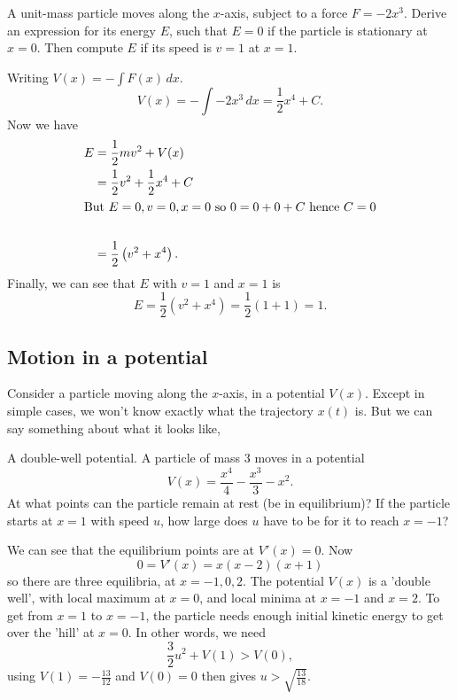\documentclass[10pt, a4paper]{article}
\begin{document}
\begin{example}
    A unit-mass particle moves along the $x$-axis,
    subject to a force $F = -2x ^ 3$.
    Derive an expression for its energy $E$,
    such that $E = 0$ if the particle is stationary at $x = 0$.
    Then compute $E$ if its speed is $v = 1$ at $x = 1$.
    \begin{solution}
        Writing $V(x) = -\int F(x)\,dx$.
        \[
        V(x) = -\int -2x ^ 3\,dx = \frac{1}{2}x ^ 4 + C.
        \]
        Now we have
        \begin{align*}
            E &= \frac{1}{2}mv ^ 2 + V(x) \\
            &= \frac{1}{2}v ^ 2 + \frac{1}{2}x ^ 4 + C \\
            \intertext{But $E = 0, v = 0, x = 0$ so $0 = 0 + 0 + C$ hence $C = 0$} \\
            &= \frac{1}{2}\left(v ^ 2 + x ^ 4\right).
        \end{align*}
        Finally,
        we can see that $E$ with $v = 1$ and $x = 1$ is
        \[
        E = \frac{1}{2}\left(v ^ 2 + x ^ 4\right) = \frac{1}{2}(1 + 1) = 1.
        \]
    \end{solution}
\end{example}

\subsection{Motion in a potential}
Consider a particle moving along the $x$-axis,
in a potential $V(x)$.
Except in simple cases,
we won't know exactly what the trajectory $x(t)$ is.
But we can say something about what it looks like,

\begin{example}
    A double-well potential.
    A particle of mass $3$ moves in a potential
    \[
    V(x) = \frac{x ^ 4}{4} - \frac{x ^ 3}{3} - x ^ 2.
    \]
    At what points can the particle remain at rest
    (be in equilibrium)?
    If the particle starts at $x = 1$ with speed $u$,
    how large does $u$ have to be for it to reach $x = -1$?
    \begin{solution}
        We can see that the equilibrium points are at $V'(x) = 0$.
        Now
        \[
        0 = V'(x) = x(x - 2)(x + 1)
        \]
        so there are three equilibria,
        at $x = -1, 0, 2$.
        The potential $V(x)$ is a 'double well',
        with local maximum at $x = 0$,
        and local minima at $x = -1$ and $x = 2$.
        To get from $x = 1$ to $x = -1$,
        the particle needs enough initial kinetic energy to get over the 'hill' at $x = 0$.
        In other words,
        we need
        \[
        \frac{3}{2}u ^ 2 + V(1) > V(0),
        \]
        using $V(1) = -\frac{13}{12}$ and $V(0) = 0$ then gives $u > \sqrt{\frac{13}{18}}$.
    \end{solution}
\end{example}
\end{document}
